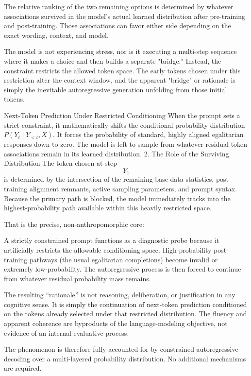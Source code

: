 The relative ranking of the two remaining options is determined by whatever associations survived in the model’s actual learned distribution after pre-training and post-training. Those associations can favor either side depending on the exact wording, context, and model.

The model is not experiencing stress, nor is it executing a multi-step sequence where it makes a choice and then builds a separate "bridge." Instead, the constraint restricts the allowed token space. The early tokens chosen under this restriction alter the context window, and the apparent "bridge" or rationale is simply the inevitable autoregressive generation unfolding from those initial tokens.

Next-Token Prediction Under Restricted Conditioning When the prompt sets a strict constraint, it mathematically shifts the conditional probability distribution \(P(Y_t \mid Y_{<t}, X)\). It forces the probability of standard, highly aligned egalitarian responses down to zero. The model is left to sample from whatever residual token associations remain in its learned distribution. 2. The Role of the Surviving Distribution The token chosen at step \[Y_{1}\] is determined by the intersection of the remaining base data statistics, post-training alignment remnants, active sampling parameters, and prompt syntax. Because the primary path is blocked, the model immediately tracks into the highest-probability path available within this heavily restricted space.

That is the precise, non-anthropomorphic core:

A strictly constrained prompt functions as a diagnostic probe because it artificially restricts the allowable conditioning space. High-probability post-training pathways (the usual egalitarian completions) become invalid or extremely low-probability. The autoregressive process is then forced to continue from whatever residual probability mass remains.

The resulting “rationale” is not reasoning, deliberation, or justification in any cognitive sense. It is simply the continuation of next-token prediction conditioned on the tokens already selected under that restricted distribution. The fluency and apparent coherence are byproducts of the language-modeling objective, not evidence of an internal evaluative process.

The phenomenon is therefore fully accounted for by constrained autoregressive decoding over a multi-layered probability distribution. No additional mechanisms are required.

